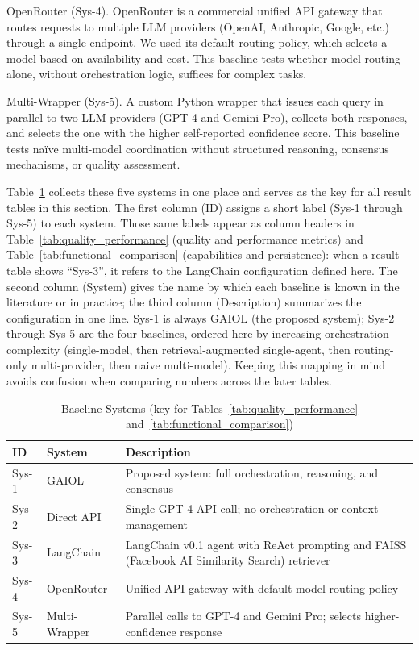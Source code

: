 \documentclass{iopjournal}
\begin{document}
OpenRouter (Sys-4). OpenRouter is a commercial unified API gateway that routes requests to multiple LLM providers (OpenAI, Anthropic, Google, etc.) through a single endpoint. We used its default routing policy, which selects a model based on availability and cost. This baseline tests whether model-routing alone, without orchestration logic, suffices for complex tasks.

Multi-Wrapper (Sys-5). A custom Python wrapper that issues each query in parallel to two LLM providers (GPT-4 and Gemini Pro), collects both responses, and selects the one with the higher self-reported confidence score. This baseline tests na\"ive multi-model coordination without structured reasoning, consensus mechanisms, or quality assessment.

Table~\ref{tab:baselines} collects these five systems in one place and serves as the key for all result tables in this section. The first column (ID) assigns a short label (Sys-1 through Sys-5) to each system. Those same labels appear as column headers in Table~\ref{tab:quality_performance} (quality and performance metrics) and Table~\ref{tab:functional_comparison} (capabilities and persistence): when a result table shows ``Sys-3'', it refers to the LangChain configuration defined here. The second column (System) gives the name by which each baseline is known in the literature or in practice; the third column (Description) summarizes the configuration in one line. Sys-1 is always GAIOL (the proposed system); Sys-2 through Sys-5 are the four baselines, ordered here by increasing orchestration complexity (single-model, then retrieval-augmented single-agent, then routing-only multi-provider, then naive multi-model). Keeping this mapping in mind avoids confusion when comparing numbers across the later tables.
\begin{table}[!ht]
\centering
\caption{Baseline Systems (key for Tables~\ref{tab:quality_performance} and~\ref{tab:functional_comparison})}
\label{tab:baselines}
\begin{tabular}{llp{4.5cm}}
\toprule
ID & System & Description \\
\midrule
Sys-1 & GAIOL & Proposed system: full orchestration, reasoning, and consensus \\
Sys-2 & Direct API & Single GPT-4 API call; no orchestration or context management \\
Sys-3 & LangChain & LangChain v0.1 agent with ReAct prompting and FAISS (Facebook AI Similarity Search) retriever \\
Sys-4 & OpenRouter & Unified API gateway with default model routing policy \\
Sys-5 & Multi-Wrapper & Parallel calls to GPT-4 and Gemini Pro; selects higher-confidence response \\
\bottomrule
\end{tabular}
\end{table}
\end{document}
